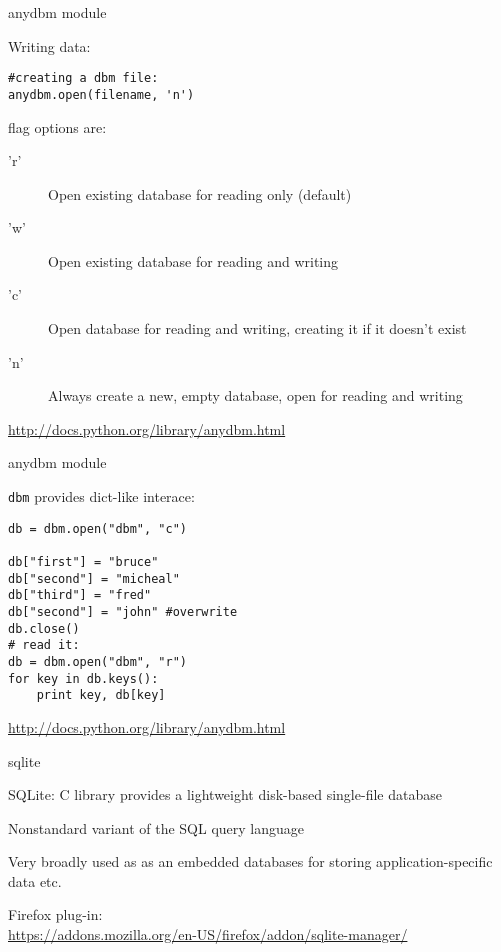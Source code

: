 \documentclass{beamer}
\begin{document}
\begin{frame}[fragile]{anydbm module}

{\Large Writing data:}

\begin{verbatim}
#creating a dbm file:
anydbm.open(filename, 'n') 
\end{verbatim}

{\large flag options are: }
\begin{description}
  \item['r']  Open existing database for reading only (default)
  \item['w']  Open existing database for reading and writing
  \item['c']  Open database for reading and writing, creating it if it doesn’t exist
  \item['n']  Always create a new, empty database, open for reading and writing
\end{description}
\vfill
\url{http://docs.python.org/library/anydbm.html}
\end{frame}

\begin{frame}[fragile]{anydbm module}

{\Large \verb|dbm| provides dict-like interace:}

\begin{verbatim}
db = dbm.open("dbm", "c")

db["first"] = "bruce"
db["second"] = "micheal"
db["third"] = "fred"
db["second"] = "john" #overwrite
db.close()
# read it:
db = dbm.open("dbm", "r")
for key in db.keys():
    print key, db[key]
\end{verbatim}

\vfill
\url{http://docs.python.org/library/anydbm.html}
\end{frame}


\begin{frame}[fragile]{sqlite}

\vfill
{\Large SQLite: C library provides a lightweight disk-based single-file database}

\vfill
{\Large Nonstandard variant of the SQL query language}

\vfill
{\Large Very broadly used as as an embedded databases for storing
        application-specific data etc.}

\vfill
Firefox plug-in:\\
\url{https://addons.mozilla.org/en-US/firefox/addon/sqlite-manager/}
\end{frame} 
\end{document}
